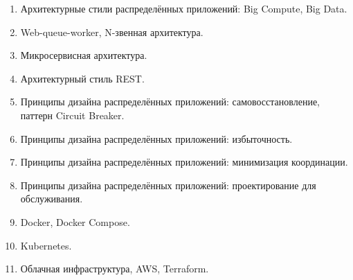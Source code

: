 \documentclass[a5paper]{article}
\begin{document}
\begin{enumerate}
    \item Архитектурные стили распределённых приложений: Big Compute, Big Data.
    \item Web-queue-worker, N-звенная архитектура.
    \item Микросервисная архитектура.
    \item Архитектурный стиль REST.
    \item Принципы дизайна распределённых приложений: самовосстановление, паттерн Circuit Breaker.
    \item Принципы дизайна распределённых приложений: избыточность.
    \item Принципы дизайна распределённых приложений: минимизация координации.
    \item Принципы дизайна распределённых приложений: проектирование для обслуживания.
    \item Docker, Docker Compose.
    \item Kubernetes.
    \item Облачная инфраструктура, AWS, Terraform.
\end{enumerate}
\end{document}
